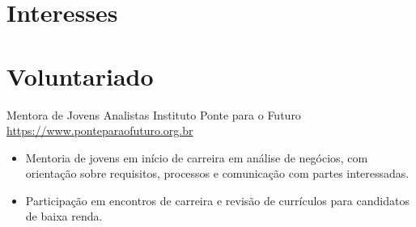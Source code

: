 \documentclass[a4paper, serif, 10pt]{moderncv}
\begin{document}
\section{Interesses}

\section{Voluntariado}

        {Mentora de Jovens Analistas}
        {Instituto Ponte para o Futuro}
        {\url{https://www.ponteparaofuturo.org.br}}
        {}
        {\begin{itemize}
\item Mentoria de jovens em início de carreira em análise de negócios, com orientação sobre requisitos, processos e comunicação com partes interessadas.
\item Participação em encontros de carreira e revisão de currículos para candidatos de baixa renda.
\end{itemize}}
    
\end{document}
